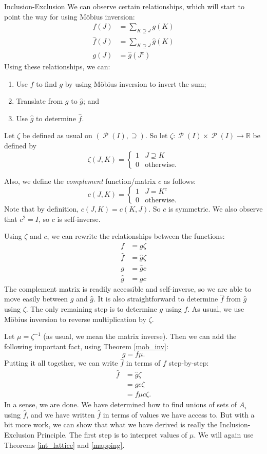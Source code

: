 \documentclass[12pt]{pom_thesis}
\DeclareMathOperator{\ps}{\mathscr{P}}
\newcommand{\Rr}{\mathbb{R}}
\begin{document}
\begin{chapter}{Inclusion-Exclusion}
We can observe certain relationships, which will start to point the way for using M\"obius inversion:
\begin{align*}
f(J) &= \sum_{K \supseteq J} g(K)\\
\hat{f}(J) &= \sum_{K \supseteq J} \hat{g}(K)\\
g(J) &= \hat{g}(J^c)
\end{align*}
Using these relationships, we can:
\begin{enumerate}
\item Use $f$ to find $g$ by using M\"obius inversion to invert the sum;
\item Translate from $g$ to $\hat{g}$; and
\item Use $\hat{g}$ to determine $\hat{f}$.
\end{enumerate}

Let $\zeta$ be defined as usual on $(\ps(I), \supseteq)$. So let $\zeta:\ps(I) \times \ps(I) \rightarrow \Rr$ be defined by
\[
\zeta(J,K) = \begin{cases} 1 & J \supseteq K \\ 0 & \text{otherwise}. \end{cases}
\]

Also, we define the \emph{complement} function/matrix $c$ as follows: 
\[
c(J,K) = \begin{cases} 1 & J = K^c \\ 0 & \text{otherwise}. \end{cases}
\]
Note that by definition, $c(J,K) = c(K,J)$. So $c$ is symmetric. We also observe that $c^2 = I$, so $c$ is self-inverse. 

Using $\zeta$ and $c$, we can rewrite the relationships between the functions:
\begin{align*}
f &= g\zeta\\
\hat{f} &= \hat{g}\zeta\\
g &= \hat{g}c\\
\hat{g} &= gc
\end{align*}
The complement matrix is readily accessible and self-inverse, so we are able to move easily between $g$ and $\hat{g}$. It is also straightforward to determine $\hat{f}$ from $\hat{g}$ using $\zeta$. The only remaining step is to determine $g$ using $f$. As usual, we use M\"obius inversion to reverse multiplication by $\zeta$.

Let $\mu = \zeta^{-1}$ (as usual, we mean the matrix inverse). Then we can add the following important fact, using Theorem \ref{mob_inv}:
\[
g = f\mu.
\]
Putting it all together, we can write $\hat{f}$ in terms of $f$ step-by-step:
\begin{align*}
\hat{f} &= \hat{g}\zeta\\
&= gc\zeta\\
&= f\mu c\zeta.
\end{align*}
In a sense, we are done. We have determined how to find unions of sets of $A_i$ using $\hat{f}$, and we have written $\hat{f}$ in terms of values we have access to. But with a bit more work, we can show that what we have derived is really the Inclusion-Exclusion Principle. The first step is to interpret values of $\mu$. We will again use Theorems \ref{int_lattice} and \ref{mapping}. 


\end{chapter}
\end{document}
